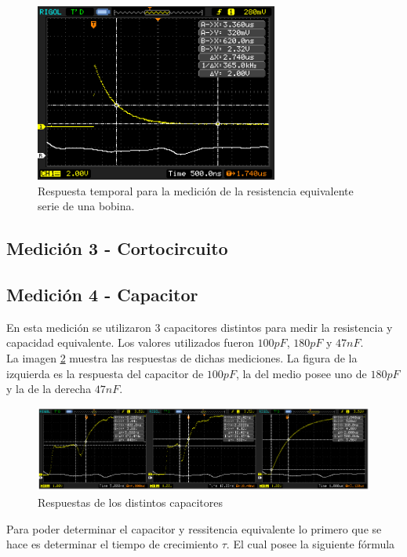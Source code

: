\documentclass[a4paper,10pt]{article}
\begin{document}
		\begin{figure}[!htb]
			\centering
			\includegraphics[width=8cm]
			{Imagenes/InductorR.png}
			\caption{Respuesta temporal para la medici\'on de la resistencia 
			equivalente serie de una bobina.}
			\label{img007}
		\end{figure}			
	
	
	\subsection{Medición 3 - Cortocircuito}

	\subsection{Medición 4 - Capacitor}
	\indent En esta medición se utilizaron 3 capacitores distintos para medir
	la resistencia y capacidad equivalente. Los valores utilizados fueron 
	$100pF$, $180pF$ y $47nF$. \\
	\indent La imagen \ref{img010} muestra las respuestas de dichas 
	mediciones. La figura de la izquierda es la respuesta del capacitor de 
	$100pF$, la del medio posee uno de $180pF$ y la de la derecha $47nF$. \\
	
		\begin{figure}[!htb]
			\centering
			\includegraphics[width=12cm]
			{Imagenes/CurvasCapacitor.png}
			\caption{Respuestas de los distintos capacitores}
			\label{img010} 
		\end{figure}

	\indent Para poder determinar el capacitor y ressitencia equivalente lo 
	primero que se hace es determinar el tiempo de crecimiento $\tau$. El cual
	posee la siguiente fórmula
\end{document}
